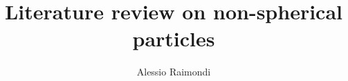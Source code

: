 \documentclass[11pt]{beamer}
\begin{document}
	\author{Alessio Raimondi}
	\title{Literature review on non-spherical particles}
	\begin{frame}[plain]
		\maketitle
	\end{frame}
	

\end{document}

